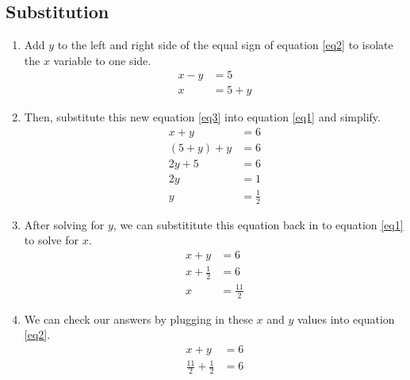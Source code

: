 \documentclass{article}
\begin{document}
    \subsection*{Substitution}
    \begin{enumerate}
    \item Add $y$ to the left and right side of the equal sign of equation \eqref{eq2}
    to isolate the $x$ variable to one side.
    \begin{align}
        x - y &= 5 \nonumber \\
        x &= 5 + y \label{eq3}
    \end{align} 
    \item Then, substitute this new equation \eqref{eq3} into equation 
    \eqref{eq1} and simplify.
    \begin{align*}
        x + y &= 6 \\
        (5 + y) + y &= 6 \\
        2y + 5 &= 6 \\
        2y &= 1 \\
        y &= \frac{1}{2}
    \end{align*}
    \item After solving for $y$, we can substititute this equation back in to 
    equation \eqref{eq1} to solve for $x$.
    \begin{align*}
        x + y &= 6 \\
        x + \frac{1}{2} &= 6 \\
        x &= \frac{11}{2}
    \end{align*} 
    \item We can check our answers by plugging in these $x$ and $y$ values 
    into equation \eqref{eq2}.
    \begin{align*}
        x + y &= 6 \\
        \frac{11}{2} + \frac{1}{2} &= 6
    \end{align*}
    \end{enumerate}
\end{document}

